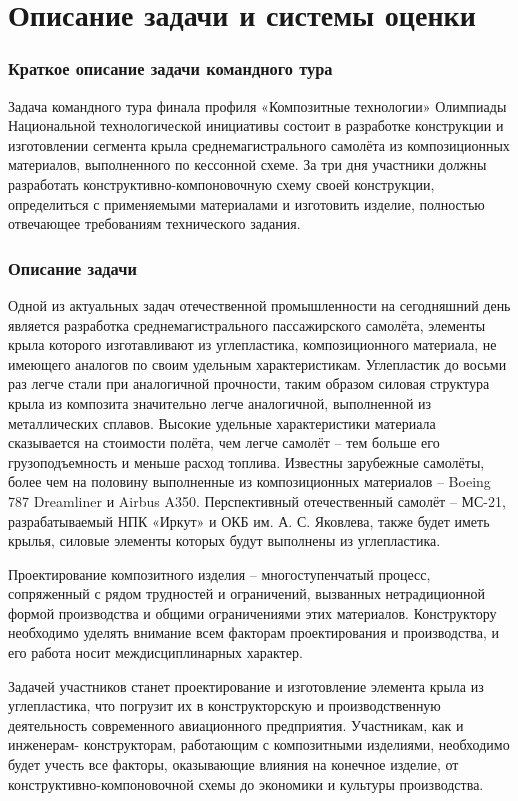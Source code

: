 \section{Описание задачи и системы оценки}

\subsubsection*{Краткое описание задачи командного тура}

Задача командного тура финала профиля «Композитные технологии» Олимпиады Национальной технологической инициативы состоит в разработке конструкции и изготовлении сегмента крыла среднемагистрального самолёта из композиционных материалов, выполненного по кессонной схеме. За три дня участники должны разработать конструктивно-компоновочную схему своей конструкции, определиться с применяемыми материалами и изготовить изделие, полностью отвечающее требованиям технического задания.

\subsubsection*{Описание задачи}

Одной из актуальных задач отечественной промышленности на сегодняшний день является разработка среднемагистрального пассажирского самолёта, элементы крыла которого изготавливают из углепластика, композиционного материала, не имеющего аналогов по своим удельным характеристикам. Углепластик до восьми раз легче стали при аналогичной прочности, таким образом силовая структура крыла из композита значительно легче аналогичной, выполненной из металлических сплавов. Высокие удельные характеристики материала сказывается на стоимости полёта, чем легче самолёт – тем больше его грузоподъемность и меньше расход топлива. Известны зарубежные самолёты, более чем на половину выполненные из композиционных материалов – Boeing 787 Dreamliner и Airbus A350. Перспективный отечественный самолёт – МС-21, разрабатываемый НПК «Иркут» и ОКБ им. А. С. Яковлева, также будет иметь крылья, силовые элементы которых будут выполнены из углепластика.

Проектирование композитного изделия – многоступенчатый процесс, сопряженный с рядом трудностей и ограничений, вызванных нетрадиционной формой производства и общими ограничениями этих материалов. Конструктору необходимо уделять внимание всем факторам проектирования и производства, и его работа носит междисциплинарных характер.

Задачей участников станет проектирование и изготовление элемента крыла из углепластика, что погрузит их в конструкторскую и производственную деятельность современного авиационного предприятия. Участникам, как и инженерам- конструкторам, работающим с композитными изделиями, необходимо будет учесть все факторы, оказывающие влияния на конечное изделие, от конструктивно-компоновочной схемы до экономики и культуры производства.

